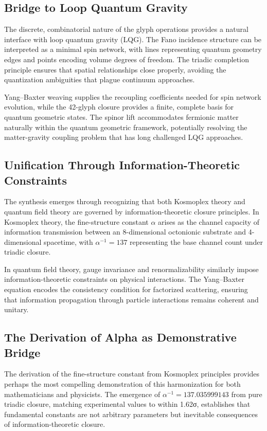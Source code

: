 \documentclass[pdflatex,sn-mathphys-num]{sn-jnl}
\theoremstyle{thmstyleone}
\theoremstyle{thmstyletwo}
\theoremstyle{thmstylethree}
\begin{document}
\subsection{Bridge to Loop Quantum Gravity}

The discrete, combinatorial nature of the glyph operations provides a natural interface with loop quantum gravity (LQG). The Fano incidence structure can be interpreted as a minimal spin network, with lines representing quantum geometry edges and points encoding volume degrees of freedom. The triadic completion principle ensures that spatial relationships close properly, avoiding the quantization ambiguities that plague continuum approaches.

Yang--Baxter weaving supplies the recoupling coefficients needed for spin network evolution, while the 42-glyph closure provides a finite, complete basis for quantum geometric states. The spinor lift accommodates fermionic matter naturally within the quantum geometric framework, potentially resolving the matter-gravity coupling problem that has long challenged LQG approaches.

\subsection{Unification Through Information-Theoretic Constraints}

The synthesis emerges through recognizing that both Kosmoplex theory and quantum field theory are governed by information-theoretic closure principles. In Kosmoplex theory, the fine-structure constant $\alpha$ arises as the channel capacity of information transmission between an 8-dimensional octonionic substrate and 4-dimensional spacetime, with $\alpha^{-1} = 137$ representing the base channel count under triadic closure.

In quantum field theory, gauge invariance and renormalizability similarly impose information-theoretic constraints on physical interactions. The Yang--Baxter equation encodes the consistency condition for factorized scattering, ensuring that information propagation through particle interactions remains coherent and unitary.

\subsection{The Derivation of Alpha as Demonstrative Bridge}

The derivation of the fine-structure constant from Kosmoplex principles provides perhaps the most compelling demonstration of this harmonization for both mathematicians and physicists. The emergence of $\alpha^{-1} = 137.035999143$ from pure triadic closure, matching experimental values to within 1.62σ, establishes that fundamental constants are not arbitrary parameters but inevitable consequences of information-theoretic closure.
\end{document}
